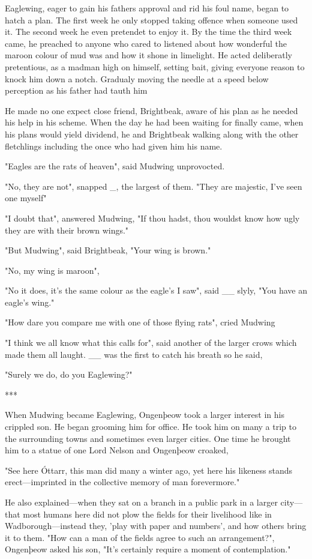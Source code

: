 Eaglewing, eager to gain his fathers approval and rid his foul name, began to hatch a plan. The first week he only stopped taking offence when someone used it. The second week he even pretendet to enjoy it. By the time the third week came, he preached to anyone who cared to listened about how wonderful the maroon colour of mud was and how it shone in limelight. He acted deliberatly pretentious, as a madman high on himself, setting bait, giving everyone reason to knock him down a notch. Gradualy moving the needle at a speed below perception as his father had tauth him

He made no one expect close friend, Brightbeak, aware of his plan as he needed his help in his scheme. When the day he had been waiting for finally came, when his plans would yield dividend, he and Brightbeak walking along with the other fletchlings including the once who had given him his name.

"Eagles are the rats of heaven", said Mudwing unprovocted.

"No, they are not", snapped \_, the largest of them. "They are majestic, I've seen one myself"

"I doubt that", answered Mudwing, "If thou hadst, thou wouldst know how ugly they are with their brown wings."

"But Mudwing", said Brightbeak, "Your wing is brown."

"No, my wing is maroon", 

"No it does, it's the same colour as the eagle's I saw", said \_\_ slyly, "You have an eagle's wing."

"How dare you compare me with one of those flying rats", cried Mudwing

"I think we all know what this calls for", said another of the larger crows which made them all laught. \_\_ was the first to catch his breath so he said,  

"Surely we do, do you Eaglewing?"

***

When Mudwing became Eaglewing, Ongenþeow took a larger interest in his crippled son. He began grooming him for office. He took him on many a trip to the surrounding towns and sometimes even larger cities. One time he brought him to a statue of one Lord Nelson and Ongenþeow croaked, 

"See here Óttarr, this man did many a winter ago, yet here his likeness stands erect---imprinted in the collective memory of man forevermore."

He also explained---when they sat on a branch in a public park in a larger city---that most humans here did not plow the fields for their livelihood like in Wadborough---instead they, 'play with paper and numbers', and how others bring it to them. "How can a man of the fields agree to such an arrangement?", Ongenþeow asked his son, "It's certainly require a moment of contemplation."

